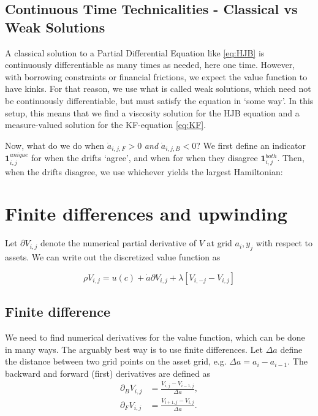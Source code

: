 \documentclass[12pt]{article}
\DeclareMathOperator{\1}{\mathbbm{1}}
\begin{document}
\subsection{Continuous Time Technicalities - Classical vs Weak Solutions}
\label{sec:contdetails}
A classical solution to a Partial Differential Equation like \ref{eq:HJB} is continuously differentiable as many times as needed, here one time. However, with borrowing constraints or financial frictions, we expect the value function to have kinks. For that reason, we use what is called weak solutions, which need not be continuously differentiable, but must satisfy the equation in `some way'. In this setup, this means that we find a viscosity solution for the HJB equation and a measure-valued solution for the KF-equation \eqref{eq:KF}.

Now, what do we do when $\dot a_{i,j,F}>0$ \textit{and} $\dot a_{i,j,B}<0$? We first define an indicator $\mathbf{1}^{unique}_{i,j}$ for when the drifts `agree', and when for when they disagree $\mathbf{1}^{both}_{i,j}$. Then, when the drifts disagree, we use whichever yields the largest Hamiltonian:

\section{Finite differences and upwinding}
 Let $\partial V_{i,j}$ denote the numerical partial derivative of $V$ at grid $a_i,y_j$ with respect to assets. We can write out the discretized value function as 

\begin{equation}
\rho V_{i,j} =u(c) + \dot a \partial V_{i,j} + \lambda [V_{i,-j} - V_{i,j}]
\end{equation}

\subsection{Finite difference}
We need to find numerical derivatives for the value function, which can be done in many ways. The arguably best way is to use finite differences. Let $\Delta a$ define the distance between two grid points on the asset grid, e.g. $\Delta a=a_i-a_{i-1}$. The backward and forward (first) derivatives are defined as
    \begin{align}
    \partial_{B}V_{i,j}&=\frac{V_{i,j}-V_{i-1,j}}{\Delta a}, \label{eq:backder}\\
    \partial_{F}V_{i,j}&=\frac{V_{i+1,j}-V_{i,j}}{\Delta a}. \label{eq:forder}
    \end{align}
    
\end{document}
